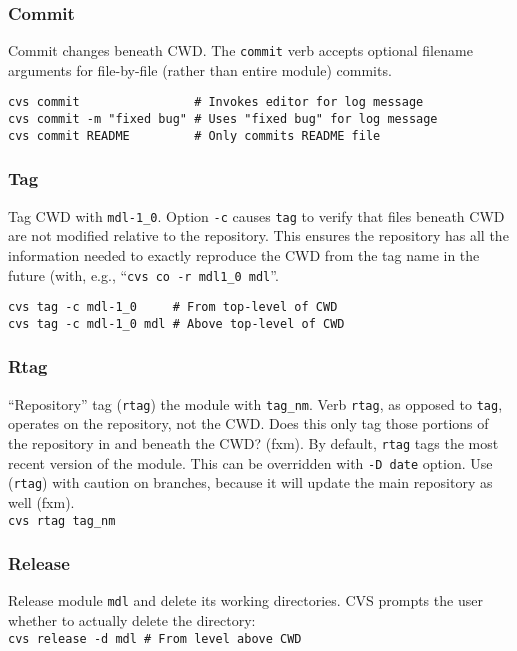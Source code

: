 \documentclass[12pt,twoside]{article}
\begin{document}
\subsubsection[Commit]{Commit}
Commit changes beneath CWD. 
The \verb'commit' verb accepts optional filename arguments for
file-by-file (rather than entire module) commits.
\begin{verbatim}
cvs commit                # Invokes editor for log message
cvs commit -m "fixed bug" # Uses "fixed bug" for log message
cvs commit README         # Only commits README file
\end{verbatim}

\subsubsection[Tag]{Tag}
Tag CWD with \verb'mdl-1_0'. 
Option \verb'-c' causes \verb'tag' to verify that files beneath CWD
are not modified relative to the repository. 
This ensures the repository has all the information needed to exactly
reproduce the CWD from the tag name in the future (with, e.g.,
``\texttt{cvs co -r mdl1\_0 mdl}''.
\begin{verbatim}
cvs tag -c mdl-1_0     # From top-level of CWD
cvs tag -c mdl-1_0 mdl # Above top-level of CWD
\end{verbatim}

\subsubsection[Rtag]{Rtag}
``Repository'' tag (\verb'rtag') the module with \verb'tag_nm'.
Verb \verb'rtag', as opposed to \verb'tag', operates on the
repository, not the CWD.  
Does this only tag those portions of the repository in and beneath the
CWD? (fxm).
By default, \verb'rtag' tags the most recent version of the
module. 
This can be overridden with \verb'-D date' option.
Use (\verb'rtag') with caution on branches, because it will update the
main repository as well (fxm).\\
\verb'cvs rtag tag_nm'

\subsubsection[Release]{Release}
Release module \verb'mdl' and delete its working
directories. 
CVS prompts the user whether to actually delete the directory:\\   
\verb'cvs release -d mdl # From level above CWD' 
\end{document}
